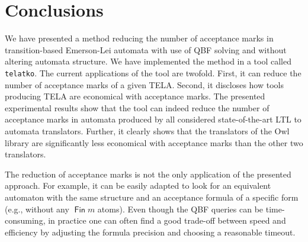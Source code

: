 \documentclass[a4paper,UKenglish,cleveref,autoref,thm-restate]{lipics-v2021}
\DeclareMathOperator{\Fin}{\mathsf{Fin}}
\begin{document}



\section{Conclusions}\label{sec:conclusion}

We have presented a method reducing the number of acceptance marks in
transition-based Emerson-Lei automata with use of QBF solving and
without altering automata structure. We have implemented the method in
a tool called \texttt{telatko}. The current applications of the tool
are twofold. First, it can reduce the number of acceptance marks of a
given TELA. Second, it discloses how tools producing TELA are
economical with acceptance marks. The presented experimental results
show that the tool can indeed reduce the number of acceptance marks in
automata produced by all considered state-of-the-art LTL to automata
translators. Further, it clearly shows that the translators of the Owl
library are significantly less economical with acceptance marks than
the other two translators.

The reduction of acceptance marks is not the only application of the
presented approach. For example, it can be easily adapted to look for
an equivalent automaton with the same structure and an acceptance
formula of a specific form (e.g., without any $\Fin m$ atoms). Even
though the QBF queries can be time-consuming, in practice one can
often find a good trade-off between speed and efficiency by adjusting 
the formula precision and choosing a reasonable timeout.



\end{document}
